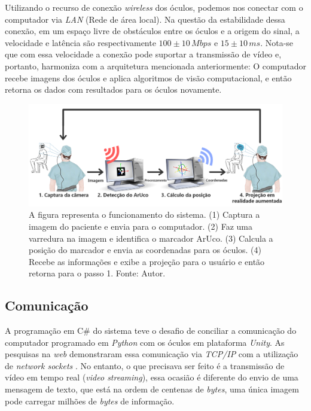 Utilizando o recurso de conexão \textit{wireless} dos óculos, podemos nos conectar com o computador via \textit{LAN} (Rede de área local). Na questão da estabilidade dessa conexão, em um espaço livre de obstáculos entre os óculos e a origem do sinal, a velocidade e latência são respectivamente \(100 \pm 10 \, Mbps\) e  \(15 \pm 10 \, ms\). Nota-se que com essa velocidade a conexão pode suportar a transmissão de vídeo e, portanto, harmoniza com a arquitetura mencionada anteriormente: O computador recebe imagens dos óculos e aplica algoritmos de visão computacional, e então retorna os dados com resultados para os óculos novamente.

\begin{figure}[ht]
    \centering
    \includegraphics[width=.9\linewidth]{figuras/System schematic.png}
    \caption{A figura representa o funcionamento do sistema. (1) Captura a imagem do paciente e envia para o computador. (2) Faz uma varredura na imagem e identifica o marcador ArUco. (3) Calcula a posição do marcador e envia as coordenadas para os óculos. (4) Recebe as informações e exibe a projeção para o usuário e então retorna para o passo 1. Fonte: Autor.}
    \label{fig:arc}
\end{figure}

\subsection{Comunicação}

A programação em C\# do sistema teve o desafio de conciliar a comunicação do computador programado em \textit{Python} com os óculos em plataforma \textit{Unity}. As pesquisas na \textit{web} demonstraram essa comunicação via \textit{TCP/IP} com a utilização de \textit{network sockets} \cite{socket-tutorial}. No entanto, o que precisava ser feito é a transmissão de vídeo em tempo real (\textit{video streaming}), essa ocasião é diferente do envio de uma mensagem de texto, que está na ordem de centenas de \textit{bytes}, uma única imagem pode carregar milhões de \textit{bytes} de informação.

